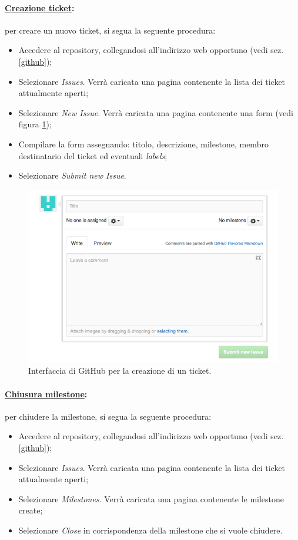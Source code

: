 \paragraph{\underline{Creazione ticket}:} per creare un nuovo ticket, si segua la seguente procedura:
\begin{itemize}
\item Accedere al repository\g{}, collegandosi all'indirizzo web opportuno (vedi sez.\ref{github});
\item Selezionare \textit{Issues}. Verrà caricata una pagina contenente la lista dei ticket attualmente aperti;
\item Selezionare \textit{New Issue}. Verrà caricata una pagina contenente una form (vedi figura \ref{newticketgithub});
\item Compilare la form assegnando: titolo, descrizione, milestone, membro destinatario del ticket ed eventuali \textit{labels};
\item Selezionare \textit{Submit new Issue}.
\end{itemize}
\begin{figure}[h!]
	\centering
	\includegraphics[scale=0.5]{./content/Immagini/Screen2}
	\caption{Interfaccia di GitHub per la creazione di un ticket.}
	\label{newticketgithub}
\end{figure}

\paragraph{\underline{Chiusura milestone}:} per chiudere la milestone\g{}, si segua la seguente procedura:
\begin{itemize}
\item Accedere al repository\g{}, collegandosi all'indirizzo web opportuno (vedi sez.\ref{github});
\item Selezionare \textit{Issues}. Verrà caricata una pagina contenente la lista dei ticket attualmente aperti;
\item Selezionare \textit{Milestones}. Verrà caricata una pagina contenente le milestone\g{} create;
\item Selezionare \textit{Close} in corrispondenza della milestone\g{} che si vuole chiudere.
\end{itemize}

